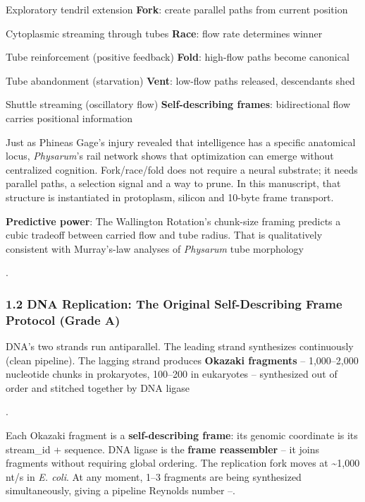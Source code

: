 \documentclass[
]{article}
\begin{document}
Exploratory tendril extension \textbar{} \textbf{Fork}: create parallel
paths from current position \textbar{}

Cytoplasmic streaming through tubes \textbar{} \textbf{Race}: flow rate
determines winner \textbar{}

Tube reinforcement (positive feedback) \textbar{} \textbf{Fold}:
high-flow paths become canonical \textbar{}

Tube abandonment (starvation) \textbar{} \textbf{Vent}: low-flow paths
released, descendants shed \textbar{}

Shuttle streaming (oscillatory flow) \textbar{} \textbf{Self-describing
frames}: bidirectional flow carries positional information \textbar{}

Just as Phineas Gage's injury revealed that intelligence has a specific
anatomical locus, \emph{Physarum}'s rail network shows that optimization
can emerge without centralized cognition. Fork/race/fold does not
require a neural substrate; it needs parallel paths, a selection signal
and a way to prune. In this manuscript, that structure is instantiated
in protoplasm, silicon and 10-byte frame transport.

\textbf{Predictive power}: The Wallington Rotation's chunk-size framing
predicts a cubic tradeoff between carried flow and tube radius. That is
qualitatively consistent with Murray's-law analyses of \emph{Physarum}
tube morphology

.

\subsubsection{\texorpdfstring{\textbf{1.2 DNA Replication: The Original
Self-Describing Frame Protocol (Grade
A)}}{1.2 DNA Replication: The Original Self-Describing Frame Protocol (Grade A)}}\label{dna-replication-the-original-self-describing-frame-protocol-grade-a}

DNA's two strands run antiparallel. The leading strand synthesizes
continuously (clean pipeline). The lagging strand produces
\textbf{Okazaki fragments} -- 1,000--2,000 nucleotide chunks in
prokaryotes, 100--200 in eukaryotes -- synthesized out of order and
stitched together by DNA ligase

.

Each Okazaki fragment is a \textbf{self-describing frame}: its genomic
coordinate is its stream\_id + sequence. DNA ligase is the \textbf{frame
reassembler} -- it joins fragments without requiring global ordering.
The replication fork moves at \textasciitilde1,000 nt/s in \emph{E.
coli}. At any moment, 1--3 fragments are being synthesized
simultaneously, giving a pipeline Reynolds number --.
\end{document}
